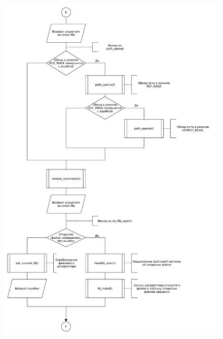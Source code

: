 \begin{figure}[H]
    \centering
    \caption{}
    \includegraphics[scale=0.5]{pdf/flowchart06.pdf}
\end{figure}

